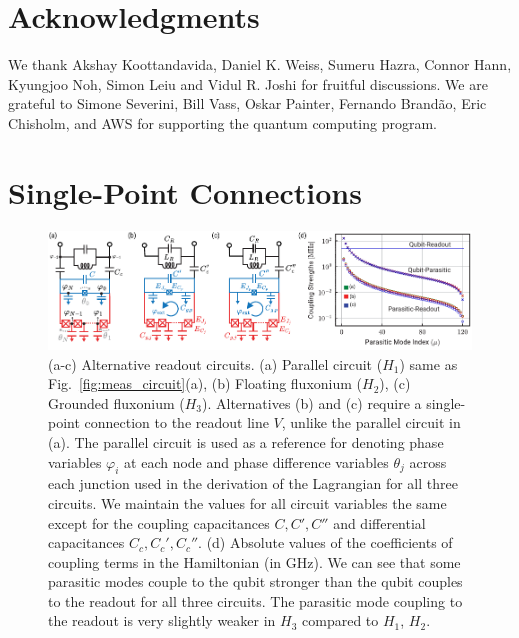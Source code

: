 \documentclass[%
reprint,
superscriptaddress,
 amsmath,amssymb,
 aps,
 prx,
longbibliography,
floatfix,
]{revtex4-2}
\begin{document}
\section{Acknowledgments}
 We thank Akshay Koottandavida, Daniel K. Weiss, Sumeru Hazra, Connor Hann, Kyungjoo Noh, Simon Leiu and Vidul R. Joshi for fruitful discussions. We are grateful to Simone Severini, Bill Vass, Oskar Painter, Fernando Brand\~ao, Eric Chisholm, and AWS for supporting the quantum computing program. %
\appendix
\section{Single-Point Connections}\label{app:alt_circuits}
\begin{figure}[htb]
    \centering
    \includegraphics[width=\linewidth]{Supp_Fig/Circuit_choice.pdf}
    \caption{(a-c) Alternative readout circuits. (a) Parallel circuit ($H_1$) same as Fig.~\ref{fig:meas_circuit}(a), (b) Floating fluxonium ($H_2$), (c) Grounded fluxonium ($H_3$). Alternatives (b) and (c) require a single-point connection to the readout line $V$, unlike the parallel circuit in (a). The parallel circuit is used as a reference for denoting phase variables $\varphi_i$ at each node and phase difference variables $\theta_j$ across each junction used in the derivation of the Lagrangian for all three circuits. We maintain the values for all circuit variables the same except for the coupling capacitances $C,C',C''$ and differential capacitances $C_c,C_c',C_c''$. (d) Absolute values of the coefficients of coupling terms in the Hamiltonian (in GHz). We can see that some parasitic modes couple to the qubit stronger than the qubit couples to the readout for all three circuits. The parasitic mode coupling to the readout is very slightly weaker in $H_3$ compared to $H_1$, $H_2$.}
    \label{fig:circuit_choice}
\end{figure}
\end{document}
